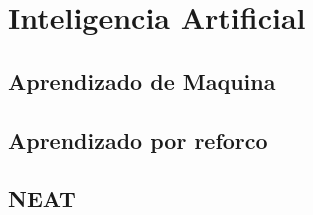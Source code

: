 \chapter{Inteligencia Artificial}

\lipsum[1-2]

\section{Aprendizado de Maquina}

\lipsum[3-4]

\section{Aprendizado por reforco}

\lipsum[4-5]

\section{NEAT}

\lipsum[6-8]
